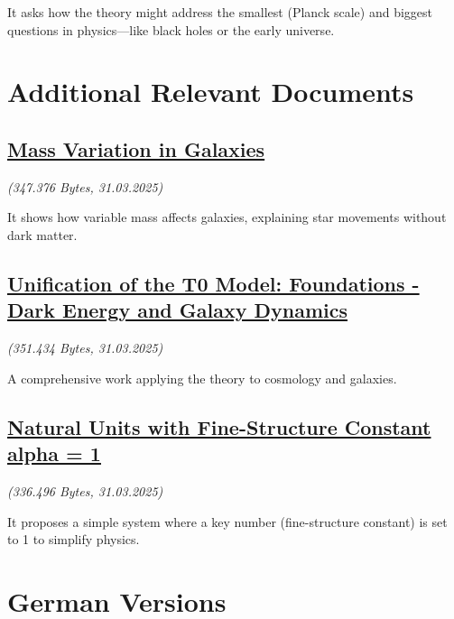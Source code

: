 \documentclass[a4paper,12pt]{article}
\newcommand{\repobase}{https://github.com/jpascher/T0-Time-Mass-Duality/tree/main/2/}
\begin{document}
	It asks how the theory might address the smallest (Planck scale) and biggest questions in physics—like black holes or the early universe.
	
	\section{Additional Relevant Documents}
	
	\subsection{\small\href{\repobase/pdf/English/Massenvariation in Galaxien_en.pdf}{Mass Variation in Galaxies}}
	\textit{(347.376 Bytes, 31.03.2025)}
	
	It shows how variable mass affects galaxies, explaining star movements without dark matter.
	
	\subsection{\small\href{\repobase/pdf/English/Vereinheitlichung des T0-Modells Grundlagen - Dunkle Energie und Galaxiendynamik_en.pdf}{Unification of the T0 Model: Foundations - Dark Energy and Galaxy Dynamics}}
	\textit{(351.434 Bytes, 31.03.2025)}
	
	A comprehensive work applying the theory to cosmology and galaxies.
	
	\subsection{\small\href{\repobase/pdf/English/Natürliche Einheiten mit Feinstrukturkonstante alpha = 1_en.pdf}{Natural Units with Fine-Structure Constant alpha = 1}}
	\textit{(336.496 Bytes, 31.03.2025)}
	
	It proposes a simple system where a key number (fine-structure constant) is set to 1 to simplify physics.
	
	\section{German Versions}
	
\end{document}
